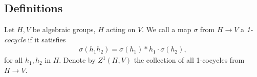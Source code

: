 % 

\subsection{Definitions}
Let $H, V$ be algebraic groups, $H$ acting on $V$. We call a map $\sigma$ from $H\rightarrow V$ a  \emph{1-cocycle} if it satisfies
\begin{eqnarray}\label{theNonabOneCocycleCondition}
	\sigma(h_1h_2) = \sigma(h_1) * h_1\cdot\sigma(h_2),
\end{eqnarray}
for all $h_1, h_2$ in $H$. Denote by $Z^1\left( H, V \right)$ the collection of all 1-cocycles from $H\rightarrow V$.

